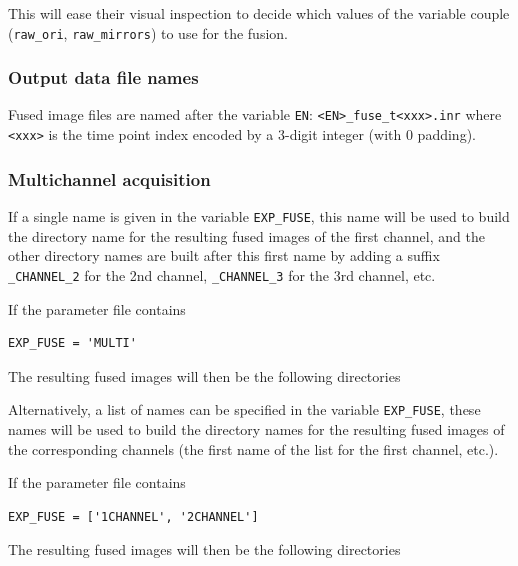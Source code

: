 \mbox{}
\mbox{}

This will ease their visual inspection to decide which values of the variable couple
(\texttt{raw\_ori}, \texttt{raw\_mirrors}) to use for the fusion.

\subsubsection{Output data file names}

Fused image files are named after the variable \texttt{EN}:
\texttt{<EN>\_fuse\_t<xxx>.inr} where \texttt{<xxx>} is the time point
index encoded by a 3-digit integer (with 0 padding).


\subsubsection{Multichannel acquisition}

If a single name is given in the variable \texttt{EXP\_FUSE}, this name will be used to build the directory name for
the resulting fused images of the first channel, and the other directory names are built after this first name by adding a suffix \texttt{\_CHANNEL\_2} for the 2nd channel, \texttt{\_CHANNEL\_3} for the 3rd channel,  etc.

If the parameter file contains
\begin{verbatim}
EXP_FUSE = 'MULTI'
\end{verbatim}
The resulting fused images will then be the following directories

\mbox{}
\mbox{}

Alternatively, a list of names can be specified in the variable \texttt{EXP\_FUSE}, these names will be used to build the directory names for
the resulting fused images of the corresponding channels (the first name of the list for the first channel, etc.).


If the parameter file contains
\begin{verbatim}
EXP_FUSE = ['1CHANNEL', '2CHANNEL']
\end{verbatim}
The resulting fused images will then be the following directories

\mbox{}
\mbox{}

